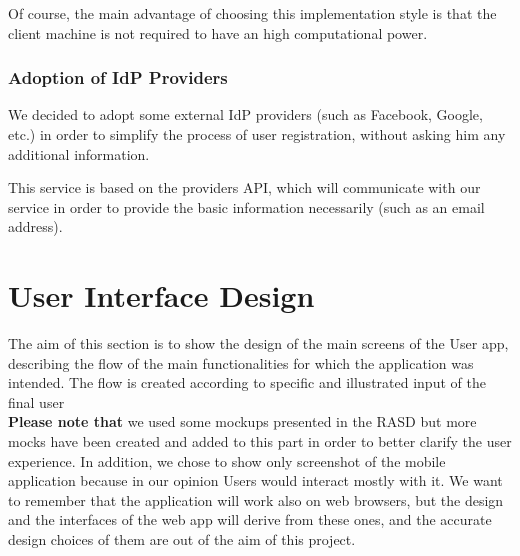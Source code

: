 \documentclass[table, 12pt]{article}
\begin{document}
Of course, the main advantage of choosing this implementation style is that the client machine is not required to have an high computational power.

\subsubsection{Adoption of IdP Providers}
We decided to adopt some external IdP providers (such as Facebook, Google, etc.) in order to simplify the process of user registration, without asking him any additional information.

This service is based on the providers API, which will communicate with our service in order to provide the basic information necessarily (such as an email address).

\section{User Interface Design}
The aim of this section is to show the design of the main screens of the User app, describing the flow of the main functionalities for which the application was intended. The flow is created according to specific and illustrated input of the final user \\
\textbf{Please note that} we used some mockups presented in the RASD but more mocks have been created and added to this part in order to better clarify the user experience. In addition, we chose to show only screenshot of the mobile application because in our opinion Users would interact mostly with it. We want to remember that the application will work also on web browsers, but the design and the interfaces of the web app will derive from these ones, and the accurate design choices of them are out of the aim of this project. \\
\end{document}
